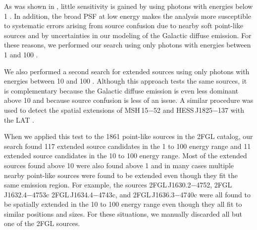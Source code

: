 As was shown in , little sensitivity is gained by
using photons with energies below 1 \gev. In addition,
the broad PSF at low energy makes the analysis more susceptible to systematic
errors arising from source confusion due to nearby soft point-like sources
and by uncertainties in our modeling of the Galactic diffuse emission. 
For these reasons,
we performed our search using only photons with energies between 1 \gev
and 100 \gev.

We also performed a second search for extended sources using only
photons with energies between 10 \gev and 100 \gev.  Although this
approach tests the same sources, it is complementary because the Galactic
diffuse emission is even less dominant above 10 \gev and because source
confusion is less of an issue.  A similar procedure was used to detect
the spatial extensions of MSH\,15$-$52 and
HESS\,J1825$-$137 with the LAT \citep{abdo_2010a_detection-energetic,grondin_2011a_detection-pulsar}.

When we applied this test to the 1861 point-like sources in the 2FGL catalog, our
search found 117 extended source candidates in the 1 \gev to 100 \gev
energy range and 11 extended source candidates in the 10 \gev to 100
\gev energy range. Most of the extended sources found above 10 \gev were
also found above 1 \gev and in many cases multiple nearby point-like
sources were found to be extended even though they fit the same emission region.
For example, the sources 2FGL\,J1630.2$-$4752, 2FGL\,J1632.4$-$4753c 2FGL\,J1634.4$-$4743c,
and 2FGL\,J1636.3$-$4740c were all found to be spatially extended in the
10 \gev to 100 \gev energy range even though they all fit to similar
positions and sizes.  For these situations, we manually discarded all
but one of the 2FGL sources.


